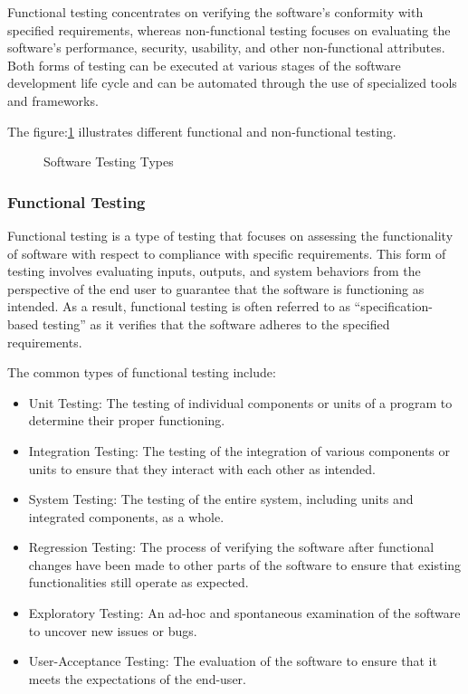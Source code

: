 Functional testing concentrates on verifying the software's conformity with specified requirements,
whereas non-functional testing focuses on evaluating the software's performance, security,
usability, and other non-functional attributes. Both forms of testing can be executed at various
stages of the software development life cycle and can be automated through the use of specialized
tools and frameworks.

The figure:\ref{fig:software_testing_types} illustrates different functional and non-functional
testing.

\begin{figure}[h]
        \centering
        \caption{Software Testing Types}\label{fig:software_testing_types}
\end{figure}

\subsubsection{Functional Testing}
Functional testing is a type of testing that focuses on assessing the functionality of software
with respect to compliance with specific requirements. This form of testing involves evaluating
inputs, outputs, and system behaviors from the perspective of the end user to guarantee that the
software is functioning as intended. As a result, functional testing is often referred to as
``specification-based testing'' as it verifies that the software adheres to the
specified requirements\cite{Differen44:online}.

The common types of functional testing include:

\begin{itemize}
        \item Unit Testing: The testing of individual components or units of a
        program to determine their proper functioning.
        \item Integration Testing: The testing of the integration of various
        components or units to ensure that they interact with each other as intended.
        \item System Testing: The testing of the entire system,
        including units and integrated components, as a whole.
        \item Regression Testing: The process of verifying the software after functional changes
        have been made to other parts of the software to ensure that existing functionalities
        still operate as expected.
        \item Exploratory Testing: An ad-hoc and spontaneous examination of
        the software to uncover new issues or bugs.
        \item User-Acceptance Testing: The evaluation of the software to ensure
        that it meets the expectations of the end-user.
\end{itemize}


